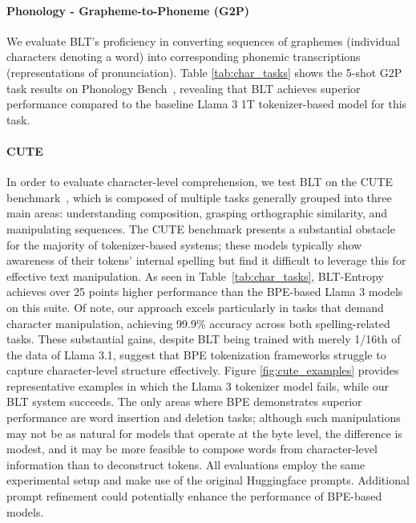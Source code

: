 \paragraph{Phonology - Grapheme-to-Phoneme (G2P)} We evaluate {\textsc BLT}'s proficiency in converting sequences of graphemes (individual characters denoting a word) into corresponding phonemic transcriptions (representations of pronunciation). Table \ref{tab:char_tasks} shows the 5-shot G2P task results on Phonology Bench~\citep{suvarna2024phonologybench}, revealing that {\textsc BLT} achieves superior performance compared to the baseline Llama 3 1T tokenizer-based model for this task.

\paragraph{CUTE}
In order to evaluate character-level comprehension, we test {\textsc BLT} on the CUTE benchmark~\citep{edman2024cute}, which is composed of multiple tasks generally grouped into three main areas: understanding composition, grasping orthographic similarity, and manipulating sequences. The CUTE benchmark presents a substantial obstacle for the majority of tokenizer-based systems; these models typically show awareness of their tokens’ internal spelling but find it difficult to leverage this for effective text manipulation. As seen in Table~\ref{tab:char_tasks}, {\textsc BLT}-Entropy achieves over 25 points higher performance than the BPE-based Llama 3 models on this suite. Of note, our approach excels particularly in tasks that demand character manipulation, achieving 99.9\% accuracy across both spelling-related tasks. These substantial gains, despite {\textsc BLT} being trained with merely 1/16th of the data of Llama 3.1, suggest that BPE tokenization frameworks struggle to capture character-level structure effectively. Figure \ref{fig:cute_examples} provides representative examples in which the Llama 3 tokenizer model fails, while our {\textsc BLT} system succeeds. The only areas where BPE demonstrates superior performance are word insertion and deletion tasks; although such manipulations may not be as natural for models that operate at the byte level, the difference is modest, and it may be more feasible to compose words from character-level information than to deconstruct tokens. All evaluations employ the same experimental setup and make use of the original Huggingface prompts. Additional prompt refinement could potentially enhance the performance of BPE-based models.

